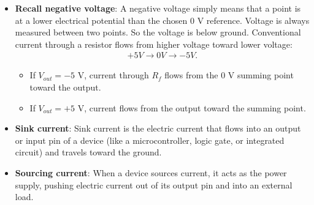 \documentclass{report}
\begin{document}
\begin{itemize}
\begin{align*}
            .\end{align*}
            We remark that if currents entering a junction are positive, currents leaving must be negative.
            \bigbreak \noindent 
            Now,
            \begin{align*}
                I_{f} &= \frac{\Delta V}{R} = \frac{0-V_{\text{out}}}{R_{f}} = -\frac{V_{\text{out}}}{R_{f}}
            .\end{align*}
            Thus,
            \begin{align*}
                \frac{V_{\text{in}}}{R_{\text{in}}}    = -\frac{V_{\text{out}}}{R_{f}}
            .\end{align*}
            Hence,
            \begin{align*}
                V_{\text{out}} = - \frac{R_{f}}{R_{\text{in}}}V_{\text{in}}
            ,\end{align*}
            and 
            \begin{align*}
                A = - \frac{R_{f}}{R_{\text{in}}}
            .\end{align*}
        \item \textbf{Recall negative voltage}: A negative voltage simply means that a point is at a lower electrical potential than the chosen \(0\text{ V}\) reference. Voltage is always measured between two points. So the voltage is below ground.
            \bigbreak \noindent 
            Conventional current through a resistor flows from higher voltage toward lower voltage:
            \begin{align*}
                +5V \to 0V \to -5V
            .\end{align*}
            \begin{itemize}
                \item If \(V_{out}=-5\text{ V}\), current through \(R_f\) flows from the \(0\text{ V}\) summing point toward the output.
                \item If \(V_{out}=+5\text{ V}\), current flows from the output toward the summing point.
            \end{itemize}
        \item \textbf{Sink current}: Sink current is the electric current that flows into an output or input pin of a device (like a microcontroller, logic gate, or integrated circuit) and travels toward the ground.
        \item \textbf{Sourcing current}: When a device sources current, it acts as the power supply, pushing electric current out of its output pin and into an external load.

\end{itemize}
\end{document}
